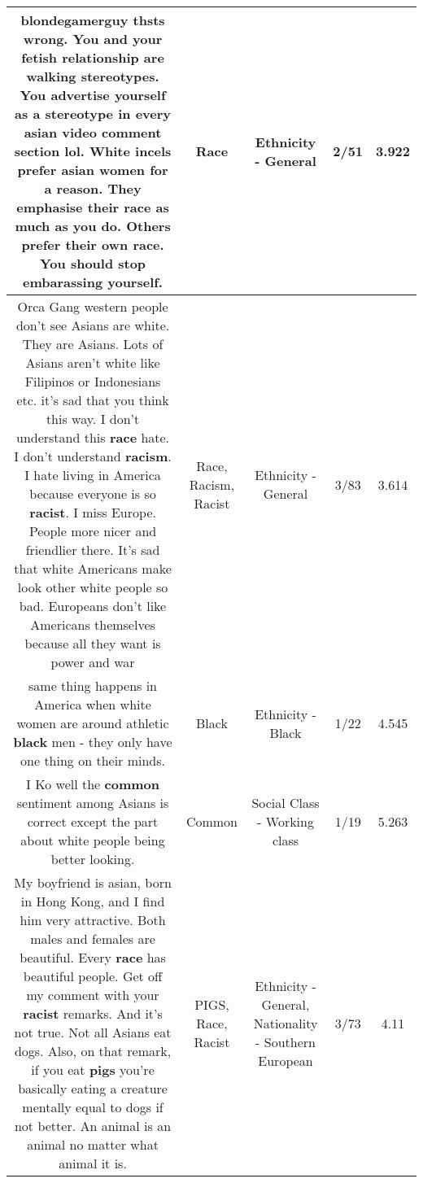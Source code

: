 \documentclass[11pt]{article}
\newlength\mylength
\begin{document}
\begin{center}
\begin{longtable}{|C{.65\mylength}|C{.30\mylength}|C{.12\mylength}|C{.12\mylength}|C{.12\mylength}|}
  \small blondegamerguy thsts wrong. You and your fetish relationship are walking stereotypes. You advertise yourself as a stereotype in every asian video comment section lol. White incels prefer asian women for a reason. They emphasise their \textbf{race} as much as you do. Others prefer their own \textbf{race}. You should stop embarassing yourself.\normalsize   & Race & Ethnicity - General & 2/51 & 3.922 \\  \hline
  \small Orca Gang western people don't see Asians are white. They are Asians. Lots of Asians aren't white like Filipinos or Indonesians etc. it's sad that you think this way. I don't understand this \textbf{race} hate. I don't understand \textbf{racism}. I hate living in America because everyone is so \textbf{racist}. I miss Europe. People more nicer and friendlier there. It's sad that white Americans make look other white people so bad. Europeans don't like Americans themselves because all they want is power and war\normalsize   & Race, Racism, Racist & Ethnicity - General & 3/83 & 3.614 \\  \hline
  \small same thing happens in America when white women are around athletic \textbf{black} men - they only have one thing on their minds.\normalsize   & Black & Ethnicity - Black & 1/22 & 4.545 \\  \hline
  \small I Ko well the \textbf{common} sentiment among Asians is correct except the part about white people being better looking.\normalsize   & Common & Social Class - Working class & 1/19 & 5.263 \\  \hline
  \small My boyfriend is asian, born in Hong Kong, and I find him very attractive. Both males and females are beautiful. Every \textbf{race} has beautiful people. Get off my comment with your \textbf{racist} remarks. And it's not true. Not all Asians eat dogs. Also, on that remark, if you eat \textbf{pigs} you're basically eating a creature mentally equal to dogs if not better. An animal is an animal no matter what animal it is.\normalsize   & PIGS, Race, Racist & Ethnicity - General, Nationality - Southern European & 3/73 & 4.11 \\  \hline

\end{longtable}
\end{center}
\end{document}

